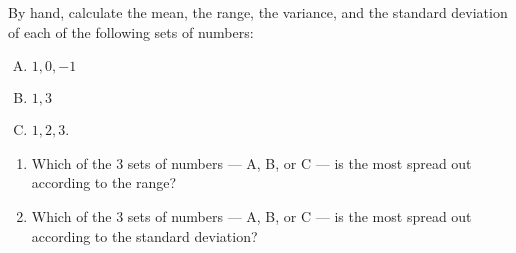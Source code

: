 
By hand, calculate the mean, the range, the variance, and the standard
deviation of each of the following sets of numbers:

\begin{enumerate}[(A)]

\item $1, 0, -1$

\item $1, 3$

\item $1, 2, 3$.

\end{enumerate}

\begin{enumerate}
\item Which of the 3 sets of numbers --- A, B, or C --- is the most spread out according to the range? 

\begin{MultipleChoice}
\end{MultipleChoice}

\item Which of the 3 sets of numbers  --- A, B, or C --- is the most spread out according to the standard deviation?

\begin{MultipleChoice}
\end{MultipleChoice}

\end{enumerate}


